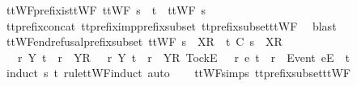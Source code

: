 \begin{isabellebody}
\endisatagproof
{\isafoldproof}%
%
\isadelimproof
\isanewline
%
\endisadelimproof
\isanewline
{}\isamarkupfalse%
\ ttWF{\isacharunderscore}prefix{\isacharunderscore}is{\isacharunderscore}ttWF{\isacharcolon}\ {\isachardoublequoteopen}ttWF\ {\isacharparenleft}s\ {\isacharat}\ t{\isacharparenright}\ {\isasymLongrightarrow}\ ttWF\ s{\isachardoublequoteclose}\isanewline
%
\isadelimproof
\ \ %
\endisadelimproof
%
\isatagproof
{}\isamarkupfalse%
\ tt{\isacharunderscore}prefix{\isacharunderscore}concat\ tt{\isacharunderscore}prefix{\isacharunderscore}imp{\isacharunderscore}prefix{\isacharunderscore}subset\ tt{\isacharunderscore}prefix{\isacharunderscore}subset{\isacharunderscore}ttWF\ \isamarkupfalse%
\ blast%
\endisatagproof
{\isafoldproof}%
%
\isadelimproof
\isanewline
%
\endisadelimproof
\isanewline
{}\isamarkupfalse%
\ ttWF{\isacharunderscore}end{\isacharunderscore}refusal{\isacharunderscore}prefix{\isacharunderscore}subset{\isacharcolon}\ {\isachardoublequoteopen}ttWF\ {\isacharparenleft}s\ {\isacharat}\ {\isacharbrackleft}{\isacharbrackleft}X{\isacharbrackright}\isactrlsub R{\isacharbrackright}{\isacharparenright}\ {\isasymLongrightarrow}\ t\ {\isasymlesssim}\isactrlsub C\ s\ {\isacharat}\ {\isacharbrackleft}{\isacharbrackleft}X{\isacharbrackright}\isactrlsub R{\isacharbrackright}\ {\isasymLongrightarrow}\ \isanewline
\ \ {\isacharparenleft}{\isasymexists}\ r\ Y{\isachardot}\ t\ {\isacharequal}\ r\ {\isacharat}\ {\isacharbrackleft}{\isacharbrackleft}Y{\isacharbrackright}\isactrlsub R{\isacharbrackright}{\isacharparenright}\ {\isasymor}\ {\isacharparenleft}{\isasymexists}\ r\ Y{\isachardot}\ t\ {\isacharequal}\ r\ {\isacharat}\ {\isacharbrackleft}{\isacharbrackleft}Y{\isacharbrackright}\isactrlsub R{\isacharcomma}\ {\isacharbrackleft}Tock{\isacharbrackright}\isactrlsub E{\isacharbrackright}{\isacharparenright}\ {\isasymor}\ {\isacharparenleft}{\isasymexists}\ r\ e{\isachardot}\ t\ {\isacharequal}\ r\ {\isacharat}\ {\isacharbrackleft}{\isacharbrackleft}Event\ e{\isacharbrackright}\isactrlsub E{\isacharbrackright}{\isacharparenright}\ {\isasymor}\ t\ {\isacharequal}\ {\isacharbrackleft}{\isacharbrackright}{\isachardoublequoteclose}\isanewline
%
\isadelimproof
\ \ %
\endisadelimproof
%
\isatagproof
{}\isamarkupfalse%
\ {\isacharparenleft}induct\ s\ t\ rule{\isacharcolon}ttWF{}{\isachardot}induct{\isacharcomma}\ auto{\isacharparenright}\isanewline
\ \ \isamarkupfalse%
\ ttWF{\isachardot}simps{\isacharparenleft}{}{}{\isacharparenright}\ tt{\isacharunderscore}prefix{\isacharunderscore}subset{\isacharunderscore}ttWF\ \isamarkupfalse%

\end{isabellebody}
